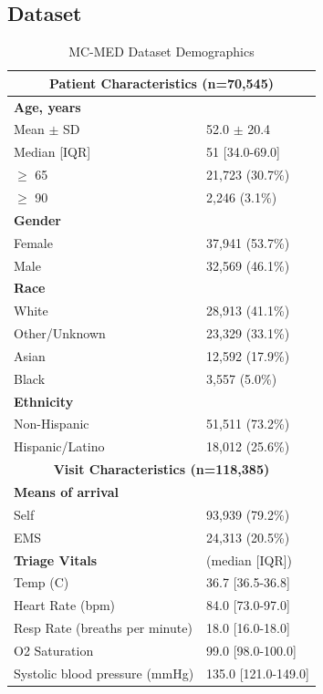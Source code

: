 \documentclass[sigconf]{acmart}
\begin{document}
\subsection{Dataset}
\begin{table}[htbp]
    \centering
    \caption{MC-MED Dataset Demographics}
    \begin{tabular}{ll}
    \hline
    \multicolumn{2}{c}{\textbf{Patient Characteristics (n=70,545)}} \\
    \hline
    \textbf{Age, years} & \\
    \quad Mean $\pm$ SD & 52.0 $\pm$ 20.4 \\
    \quad Median [IQR] & 51 [34.0-69.0] \\
    \quad $\geq$ 65 & 21,723 (30.7\%) \\
    \quad $\geq$ 90 & 2,246 (3.1\%) \\
    \textbf{Gender} & \\
    \quad Female & 37,941 (53.7\%) \\
    \quad Male & 32,569 (46.1\%) \\
    \textbf{Race} & \\
    \quad White & 28,913 (41.1\%) \\
    \quad Other/Unknown & 23,329 (33.1\%) \\
    \quad Asian & 12,592 (17.9\%) \\
    \quad Black & 3,557 (5.0\%) \\
    \textbf{Ethnicity} & \\
    \quad Non-Hispanic & 51,511 (73.2\%) \\
    \quad Hispanic/Latino & 18,012 (25.6\%) \\
    \hline
    \multicolumn{2}{c}{\textbf{Visit Characteristics (n=118,385)}} \\
    \hline
    \textbf{Means of arrival} & \\
    \quad Self & 93,939 (79.2\%) \\
    \quad EMS & 24,313 (20.5\%) \\
    \textbf{Triage Vitals} & (median [IQR]) \\
    \quad Temp (C) & 36.7 [36.5-36.8] \\
    \quad Heart Rate (bpm)  & 84.0 [73.0-97.0] \\
    \quad Resp Rate (breaths per minute) & 18.0 [16.0-18.0] \\
    \quad O2 Saturation  & 99.0 [98.0-100.0] \\
    \quad Systolic blood pressure (mmHg) & 135.0 [121.0-149.0] \\

\end{tabular}
\end{table}
\end{document}
